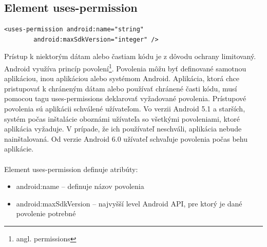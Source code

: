 \subsection{Element uses-permission}
\lstset{language=XML}
\begin{lstlisting}
<uses-permission android:name="string"
        android:maxSdkVersion="integer" />
\end{lstlisting}
Prístup k niektorým dátam alebo častiam kódu je z dôvodu ochrany limitovaný. Android využíva princíp povolení\footnote{angl. permissions}. Povolenia môžu byť definované samotnou aplikáciou, inou aplikáciou alebo systémom Android. Aplikácia, ktorá chce pristupovať k chráneným dátam alebo používať chránené časti kódu, musí pomocou tagu uses-permissions deklarovať vyžadované povolenia. Prístupové povolenia sú aplikácii schválené užívateľom. Vo verzii Android 5.1 a starších, systém počas inštalácie oboznámi užívateľa so všetkými povoleniami, ktoré aplikácia vyžaduje. V prípade, že ich používateľ neschváli, aplikácia nebude nainštalovaná. Od verzie Android 6.0 užívateľ schvaľuje povolenia počas behu aplikácie.\\\\ 
Element uses-permission definuje atribúty:\\
\begin{itemize}
\item android:name – definuje názov povolenia
\item android:maxSdkVersion – najvyšší level Android API, pre ktorý je dané povolenie potrebné
\end{itemize}

